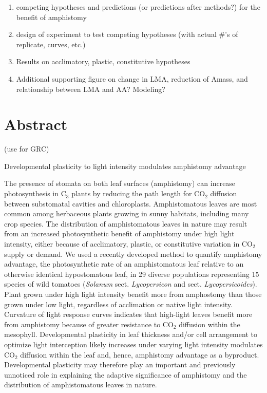 \documentclass[
  letterpaper,
  DIV=11,
  numbers=noendperiod]{scrartcl}
\providecommand{\tightlist}{%
  \setlength{\itemsep}{0pt}\setlength{\parskip}{0pt}}\usepackage{longtable,booktabs,array}
\begin{document}
\begin{enumerate}
\def\labelenumi{\arabic{enumi}.}
\tightlist
\item
  competing hypotheses and predictions (or predictions after methods?)
  for the benefit of amphistomy
\item
  design of experiment to test competing hypotheses (with actual \#'s of
  replicate, curves, etc.)
\item
  Results on acclimatory, plastic, constitutive hypotheses
\item
  Additional supporting figure on change in LMA, reduction of Amass, and
  relationship between LMA and AA? Modeling?
\end{enumerate}

\section{Abstract}\label{abstract}

(use for GRC)

Developmental plasticity to light intensity modulates amphistomy
advantage

The presence of stomata on both leaf surfaces (amphistomy) can increase
photosynthesis in C\(_3\) plants by reducing the path length for
CO\(_2\) diffusion between substomatal cavities and chloroplasts.
Amphistomatous leaves are most common among herbaceous plants growing in
sunny habitats, including many crop species. The distribution of
amphistomatous leaves in nature may result from an increased
photosynthetic benefit of amphistomy under high light intensity, either
because of acclimatory, plastic, or constitutive variation in CO\(_2\)
supply or demand. We used a recently developed method to quantify
amphistomy advantage, the photosynthetic rate of an amphistomatous leaf
relative to an otherwise identical hypostomatous leaf, in 29 diverse
populations representing 15 species of wild tomatoes (\emph{Solanum}
sect. \emph{Lycopersicon} and sect. \emph{Lycopersicoides}). Plant grown
under high light intensity benefit more from amphostomy than those grown
under low light, regardless of acclimation or native light intensity.
Curvature of light response curves indicates that high-light leaves
benefit more from amphistomy because of greater resistance to CO\(_2\)
diffusion within the mesophyll. Developmental plasticity in leaf
thickness and/or cell arrangement to optimize light interception likely
increases under varying light intensity modulates CO\(_2\) diffusion
within the leaf and, hence, amphistomy advantage as a byproduct.
Developmental plasticity may therefore play an important and previously
unnoticed role in explaining the adaptive significance of amphistomy and
the distribution of amphistomatous leaves in nature.
\end{document}
